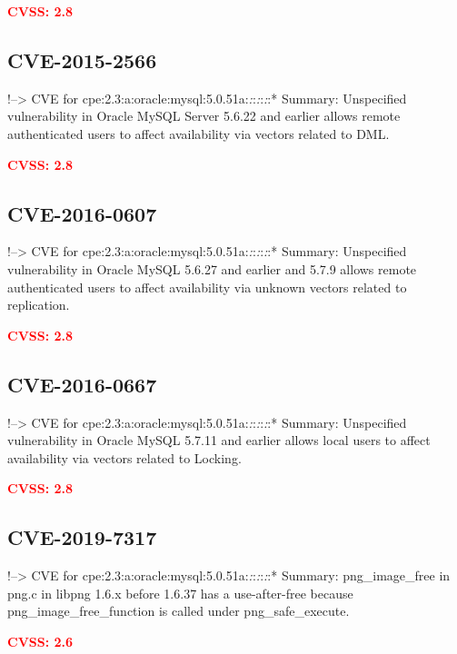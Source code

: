 \documentclass[a4paper, 12pt]{article}
\begin{document}
\textbf{\textcolor{red}{CVSS: 2.8}}

\hypertarget{cve-2015-2566}{%
\subsection{CVE-2015-2566}\label{cve-2015-2566}}

!--\textgreater{} CVE for
cpe:2.3:a:oracle:mysql:5.0.51a:\emph{:}:\emph{:}:\emph{:}:* Summary:
Unspecified vulnerability in Oracle MySQL Server 5.6.22 and earlier
allows remote authenticated users to affect availability via vectors
related to DML.

\textbf{\textcolor{red}{CVSS: 2.8}}

\hypertarget{cve-2016-0607}{%
\subsection{CVE-2016-0607}\label{cve-2016-0607}}

!--\textgreater{} CVE for
cpe:2.3:a:oracle:mysql:5.0.51a:\emph{:}:\emph{:}:\emph{:}:* Summary:
Unspecified vulnerability in Oracle MySQL 5.6.27 and earlier and 5.7.9
allows remote authenticated users to affect availability via unknown
vectors related to replication.

\textbf{\textcolor{red}{CVSS: 2.8}}

\hypertarget{cve-2016-0667}{%
\subsection{CVE-2016-0667}\label{cve-2016-0667}}

!--\textgreater{} CVE for
cpe:2.3:a:oracle:mysql:5.0.51a:\emph{:}:\emph{:}:\emph{:}:* Summary:
Unspecified vulnerability in Oracle MySQL 5.7.11 and earlier allows
local users to affect availability via vectors related to Locking.

\textbf{\textcolor{red}{CVSS: 2.8}}

\hypertarget{cve-2019-7317}{%
\subsection{CVE-2019-7317}\label{cve-2019-7317}}

!--\textgreater{} CVE for
cpe:2.3:a:oracle:mysql:5.0.51a:\emph{:}:\emph{:}:\emph{:}:* Summary:
png\_image\_free in png.c in libpng 1.6.x before 1.6.37 has a
use-after-free because png\_image\_free\_function is called under
png\_safe\_execute.

\textbf{\textcolor{red}{CVSS: 2.6}}
\end{document}
